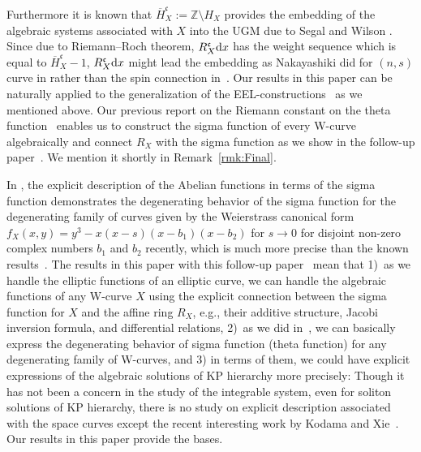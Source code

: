 \documentclass[10pt,a4paper]{amsart}
\def\ZZ{{\mathbb Z}}
\def\fc{{\mathfrak c}}
\def\BH{{\overline H}}
\numberwithin{equation}{section}
\begin{document}
Furthermore it is known that $\BH_X^\fc := \ZZ \setminus H_X$ provides the embedding of the algebraic systems associated with $X$ into the UGM due to Segal and Wilson \cite[p.~46]{SegalWilson}.
Since due to Riemann--Roch theorem, $R_X^\fc {\rm d} x$ has the weight sequence which is equal to $\BH_X^\fc-1$, $R_X^\fc {\rm d} x$ might lead the embedding as Nakayashiki did for $(n,s)$ curve in \cite{Nak10b} rather than the spin connection in~\cite{Nak16}.
Our results in this paper can be naturally applied to the generalization of the EEL-constructions~\cite{KMP19} as we mentioned above.
Our previous report on the Riemann constant on the theta function~\cite{KMP16} enables us to construct the sigma function of every W-curve algebraically and connect $R_X$ with the sigma function as we show in the follow-up paper~\cite{KMP2022b}. We mention it shortly in Re\-mark~\ref{rmk:Final}.

In \cite{FKMPA}, the explicit description of the Abelian functions in terms of the sigma function demonstrates the degenerating behavior of the sigma function for the degenerating family of curves given by the Weierstrass canonical form $f_X(x,y)=y^3-x(x-s)(x-b_1)(x-b_2)$ for $s \to 0$ for disjoint non-zero complex numbers $b_1$ and $b_2$ recently, which is much more precise than the known results~\cite{Igusa56}.
The results in this paper with this follow-up paper~\cite{KMP2022b} mean that 1)~as we handle the elliptic functions of an elliptic curve, we can handle the algebraic functions of any W-curve $X$ using the explicit connection between the sigma function for $X$ and the affine ring $R_X$, e.g., their additive structure, Jacobi inversion formula, and differential relations, 2)~as we did in~\cite{FKMPA}, we can basically express the degenerating behavior of sigma function (theta function) for any degenerating family of W-curves, and 3) in terms of them, we could have explicit expressions of the algebraic solutions of KP hierarchy more precisely:
Though it has not been a concern in the study of the integrable system, even for soliton solutions of KP hierarchy, there is no study on explicit description associated with the space curves except the recent interesting work by Kodama and Xie~\cite{KodamaX2021}.
Our results in this paper provide the bases.
\end{document}
